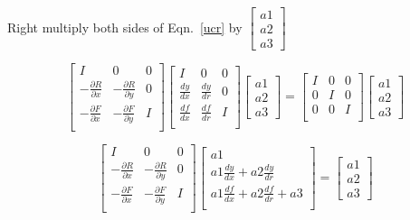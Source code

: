 \documentclass[12pt]{article}
\begin{document}
Right multiply both sides of Eqn.~\ref{ucr} by $ \begin{bmatrix}a1 \\a2 \\a3\end{bmatrix}$

\begin{equation}
  \begin{bmatrix}
    I & 0 & 0 \\
    -\frac{\partial R}{\partial x} & -\frac{\partial R}{\partial y} & 0\\
    -\frac{\partial F}{\partial x} & -\frac{\partial F}{\partial y} & I\\
  \end{bmatrix}
  \begin{bmatrix}
    I & 0 & 0 \\
    \frac{d y}{d x} & \frac{d y}{d r} & 0\\
    \frac{d f}{d x} & \frac{d f}{d r} & I\\
  \end{bmatrix}
  \begin{bmatrix}
    a1 \\
    a2 \\
    a3
  \end{bmatrix}
  =
  \begin{bmatrix}
    I & 0 & 0 \\
    0 & I & 0\\
    0 & 0 & I\\
  \end{bmatrix}
  \begin{bmatrix}
    a1 \\
    a2 \\
    a3
  \end{bmatrix}
  \label{right_mult1}
\end{equation}

\begin{equation}
  \begin{bmatrix}
    I & 0 & 0 \\
    -\frac{\partial R}{\partial x} & -\frac{\partial R}{\partial y} & 0\\
    -\frac{\partial F}{\partial x} & -\frac{\partial F}{\partial y} & I\\
  \end{bmatrix}
  \begin{bmatrix}
    a1 \\
    a1 \frac{d y}{d x} + a2 \frac{d y}{d r}\\
    a1 \frac{d f}{d x} + a2 \frac{d f}{d r} + a3\\
  \end{bmatrix}
  =
  \begin{bmatrix}
    a1 \\
    a2 \\
    a3
  \end{bmatrix}
  \label{right_mult2}
\end{equation}
\end{document}
